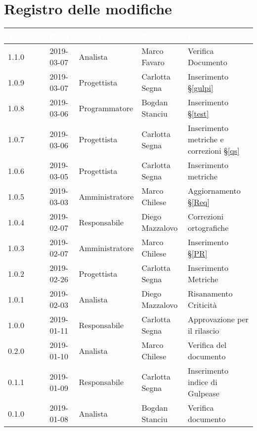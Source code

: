 \section*{Registro delle modifiche}

\begin{center}
\begin{longtable}[c]{|m{}|m{}|m{}|m{}|p{}|}
\hline
\rowcolor{bluelogo}\textbf{\textcolor{white}{Versione}} & \textbf{\textcolor{white}{Data}} & \textbf{\textcolor{white}{Autore}} & \textbf{\textcolor{white}{Ruolo}} & \textbf{\textcolor{white}{Descrizione}}\\
\hline \hline
\endfirsthead
1.1.0 & 2019-03-07 & Analista & Marco Favaro & Verifica Documento\\
\hline
\rowcolor{grigio}1.0.9 & 2019-03-07 & Progettista & Carlotta Segna & Inserimento §\ref{gulpi} \\
\hline
1.0.8 & 2019-03-06 & Programmatore & Bogdan Stanciu & Inserimento §\ref{test} \\
\hline
\rowcolor{grigio} 1.0.7 & 2019-03-06 & Progettista & Carlotta Segna & Inserimento metriche e correzioni §\ref{qs}\\
\hline
1.0.6 & 2019-03-05 & Progettista & Carlotta Segna & Inserimento metriche\\
\hline
\rowcolor{grigio} 1.0.5 & 2019-03-03 & Amministratore & Marco Chilese & Aggiornamento  §\ref{Req}\\
\hline
1.0.4 & 2019-02-07 & Responsabile & Diego Mazzalovo & Correzioni ortografiche \\
\hline
\rowcolor{grigio} 1.0.3 & 2019-02-07 & Amministratore & Marco Chilese & Inserimento §\ref{PR} \\
\hline
1.0.2 & 2019-02-26 & Progettista & Carlotta Segna & Inserimento Metriche \\
\hline
\rowcolor{grigio}1.0.1 & 2019-02-03 & Analista & Diego Mazzalovo & Risanamento Criticità \\
\hline 
1.0.0 & 2019-01-11 & Responsabile & Carlotta Segna & Approvazione per il rilascio\\
\hline
\rowcolor{grigio}0.2.0 & 2019-01-10 & Analista & Marco Chilese & Verifica del documento\\
\hline
0.1.1 & 2019-01-09 & Responsabile & Carlotta Segna & Inserimento indice di Gulpease \\
\hline
\rowcolor{grigio}0.1.0 & 2019-01-08 &  Analista & Bogdan Stanciu & Verifica documento \\

\end{longtable}
\end{center}
